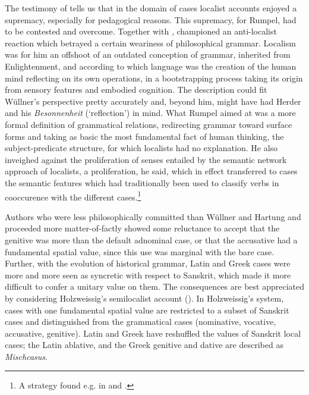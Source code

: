 \documentclass[output=paper]{langscibook}
\begin{document}
The testimony of \citet{rumpel_casuslehre_1845} tells us that in the domain of cases localist accounts enjoyed a supremacy, especially for pedagogical reasons. This supremacy, for Rumpel, had to be contested and overcome. Together with \citet{curtius_uber_1864}, \citet{rumpel_casuslehre_1845,rumpel_zur_1866} championed an anti-localist reaction which betrayed a certain weariness of philosophical grammar. Localism was for him an offshoot of an outdated conception of grammar, inherited from Enlightenment, and according to which language was the creation of the human mind reflecting on its own operations, in a bootstrapping process taking its origin from sensory features and embodied cognition. The description could fit Wüllner’s perspective pretty accurately and, beyond him, might have had Herder and his \textit{Besonnenheit} (‘reflection’) in mind. What Rumpel aimed at was a more formal definition of grammatical relations, redirecting grammar toward surface forms and taking as basic the most fundamental fact of human thinking, the subject-predicate structure, for which localists had no explanation. He also inveighed against the proliferation of senses entailed by the semantic network approach of localists, a proliferation, he said, which in effect transferred to cases the semantic features which had traditionally been used to classify verbs in cooccurence with the different cases.\footnote{A strategy found e.g. in \citet{despautere_sintaxis_1527} and \citet{lancelot_nouvelle_1653}.}

Authors who were less philosophically committed than Wüllner and Hartung and proceeded more matter-of-factly showed some reluctance to accept that the genitive was more than the default adnominal case, or that the accusative had a fundamental spatial value, since this use was marginal with the bare case. Further, with the evolution of historical grammar, Latin and Greek cases were more and more seen as syncretic with respect to Sanskrit, which made it more difficult to confer a unitary value on them. The consequences are best appreciated by considering Holzweissig’s semilocalist account (\citealt{holzweissig_wahrheit_1877}). In Holzweissig’s system, cases with one fundamental spatial value are restricted to a subset of Sanskrit cases and distinguished from the grammatical cases (nominative, vocative, accusative, genitive). Latin and Greek have reshuffled the values of Sanskrit local cases; the Latin ablative, and the Greek genitive and dative are described as \textit{Mischcasus}.
\end{document}
